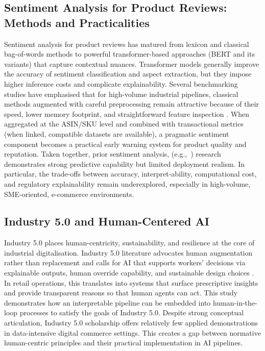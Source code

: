 \documentclass[authoryear,review,3p,times,12pt]{elsarticle}
\begin{document}
\subsection{Sentiment Analysis for Product Reviews: Methods and Practicalities}
Sentiment analysis for product reviews has matured from lexicon and classical bag-of-words methods to powerful transformer-based approaches (BERT and its variants) that capture contextual nuances. Transformer models generally improve the accuracy of sentiment classification and aspect extraction, but they impose higher inference costs and complicate explainability. Several benchmarking studies have emphasised that for high-volume industrial pipelines, classical methods augmented with careful preprocessing remain attractive because of their speed, lower memory footprint, and straightforward feature inspection \citep{liu2020sentiment, bellar12152403, DAZA2024100267}. When aggregated at the ASIN/SKU level and combined with transactional metrics (when linked, compatible datasets are available), a pragmatic sentiment component becomes a practical early warning system for product quality and reputation. Taken together, prior sentiment analysis, (e.g.,~\cite{liu2020sentiment, bellar12152403, DAZA2024100267}) research demonstrates strong predictive capability but limited deployment realism. In particular, the trade-offs between accuracy, interpret-ability, computational cost, and regulatory explainability remain underexplored, especially in high-volume, SME-oriented, e-commerce environments.

\subsection{Industry 5.0 and Human-Centered AI}
Industry 5.0 places human-centricity, sustainability, and resilience at the core of industrial digitalisation. Industry 5.0 literature advocates human augmentation rather than replacement and calls for AI that supports workers' decisions via explainable outputs, human override capability, and sustainable design choices \citep{TOTH2023102260, martini16135448,Mentzas1429186}. In retail operations, this translates into systems that surface prescriptive insights and provide transparent reasons so that human agents can act. This study demonstrates how an interpretable pipeline can be embedded into human-in-the-loop processes to satisfy the goals of Industry 5.0. Despite strong conceptual articulation, Industry 5.0 scholarship offers relatively few applied demonstrations in data-intensive digital commerce settings. This creates a gap between normative human-centric principles and their practical implementation in AI pipelines.
\end{document}
